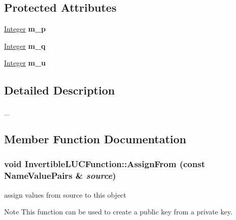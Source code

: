 \subsection*{Protected Attributes}
\begin{DoxyCompactItemize}
\item 
\hypertarget{class_invertible_l_u_c_function_a99df901efd56a9f49071744649f99539}{
\hyperlink{class_integer}{Integer} {\bfseries m\_\-p}}
\label{class_invertible_l_u_c_function_a99df901efd56a9f49071744649f99539}

\item 
\hypertarget{class_invertible_l_u_c_function_a282ee27e938e471f89a66fe743189e75}{
\hyperlink{class_integer}{Integer} {\bfseries m\_\-q}}
\label{class_invertible_l_u_c_function_a282ee27e938e471f89a66fe743189e75}

\item 
\hypertarget{class_invertible_l_u_c_function_a3ae87b160da160f48298ef7ec1d2451e}{
\hyperlink{class_integer}{Integer} {\bfseries m\_\-u}}
\label{class_invertible_l_u_c_function_a3ae87b160da160f48298ef7ec1d2451e}

\end{DoxyCompactItemize}


\subsection{Detailed Description}
\_\- 

\subsection{Member Function Documentation}
\hypertarget{class_invertible_l_u_c_function_aaaef1b335de1f76ec61079d1dfd78744}{
\subsubsection[{AssignFrom}]{\setlength{\rightskip}{0pt plus 5cm}void InvertibleLUCFunction::AssignFrom (const {\bf NameValuePairs} \& {\em source})}}
\label{class_invertible_l_u_c_function_aaaef1b335de1f76ec61079d1dfd78744}


assign values from source to this object \begin{DoxyNote}{Note}
This function can be used to create a public key from a private key. 
\end{DoxyNote}


